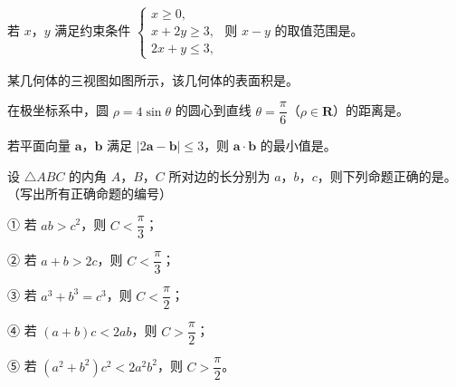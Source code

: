 \begin{question}
若 $x$，$y$ 满足约束条件 $\begin{cases}x\geqslant0,\\x+2y\geqslant3,\\2x+y\leqslant3,\end{cases}$ 则 $x-y$ 的取值范围是\gkblank{}。

\Needspace{0.4\textheight}
\end{question}
\begin{question}
某几何体的三视图如图所示，该几何体的表面积是\gkblank{}。
\nopagebreak[4]
\begin{center}\end{center}
\nopagebreak[4]
\end{question}
\begin{question}
在极坐标系中，圆 $\rho=4\sin\theta$ 的圆心到直线 $\theta=\dfrac\pi6$（$\rho\in\mathbf R$）的距离是\gkblank{}。

\end{question}
\begin{question}
若平面向量 $\boldsymbol a$，$\boldsymbol b$ 满足 $|2\boldsymbol a-\boldsymbol b|\leqslant3$，则 $\boldsymbol a\cdot\boldsymbol b$ 的最小值是\gkblank{}。

\end{question}
\begin{question}
设 $\triangle ABC$ 的内角 $A$，$B$，$C$ 所对边的长分别为 $a$，$b$，$c$，则下列命题正确的是\gkblank{}。（写出所有正确命题的编号）

① 若 $ab>c^2$，则 $C<\dfrac\pi3$；

② 若 $a+b>2c$，则 $C<\dfrac\pi3$；

③ 若 $a^3+b^3=c^3$，则 $C<\dfrac\pi2$；

④ 若 $(a+b)c<2ab$，则 $C>\dfrac\pi2$；

⑤ 若 $(a^2+b^2)c^2<2a^2b^2$，则 $C>\dfrac\pi2$。

\end{question}

